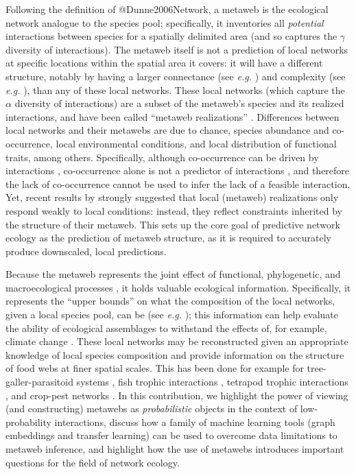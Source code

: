 Following the definition of @Dunne2006Network, a metaweb is the
ecological network analogue to the species pool; specifically, it
inventories all \emph{potential} interactions between species for a
spatially delimited area (and so captures the \(\gamma\) diversity of
interactions). The metaweb itself is not a prediction of local networks
at specific locations within the spatial area it covers: it will have a
different structure, notably by having a larger connectance (see
\emph{e.g.} \cite{Wood2015Effects}) and complexity (see \emph{e.g.}
\cite{Galiana2022Ecological}), than any of these local networks. These local
networks (which capture the \(\alpha\) diversity of interactions) are a
subset of the metaweb's species and its realized interactions, and have
been called ``metaweb realizations'' \cite{Poisot2015Species}.
Differences between local networks and their metawebs are due to chance,
species abundance and co-occurrence, local environmental conditions, and
local distribution of functional traits, among others. Specifically,
although co-occurrence can be driven by interactions
\cite{Cazelles2016Theory}, co-occurrence alone is not a predictor of
interactions \cite{Blanchet2020Cooccurrence, Thurman2019Testing}, and
therefore the lack of co-occurrence cannot be used to infer the lack of
a feasible interaction. Yet, recent results by \cite{Saravia2021Ecological}
strongly suggested that local (metaweb) realizations only respond weakly
to local conditions: instead, they reflect constraints inherited by the
structure of their metaweb. This sets up the core goal of predictive
network ecology as the prediction of metaweb structure, as it is
required to accurately produce downscaled, local predictions.

Because the metaweb represents the joint effect of functional,
phylogenetic, and macroecological processes
\cite{Morales-Castilla2015Inferring}, it holds valuable ecological
information. Specifically, it represents the ``upper bounds'' on what
the composition of the local networks, given a local species pool, can
be (see \emph{e.g.} \cite{McLeod2021Sampling}); this information can help
evaluate the ability of ecological assemblages to withstand the effects
of, for example, climate change \cite{Fricke2022Effects}. These local
networks may be reconstructed given an appropriate knowledge of local
species composition and provide information on the structure of food
webs at finer spatial scales. This has been done for example for
tree-galler-parasitoid systems \cite{Gravel2018Bringing}, fish trophic
interactions \cite{Albouy2019Marine}, tetrapod trophic interactions
\cite{Braga2019Spatial, OConnor2020Unveiling}, and crop-pest networks
\cite{Grunig2020Crop}. In this contribution, we highlight the power of
viewing (and constructing) metawebs as \emph{probabilistic} objects in
the context of low-probability interactions, discuss how a family of
machine learning tools (graph embeddings and transfer learning) can be
used to overcome data limitations to metaweb inference, and highlight
how the use of metawebs introduces important questions for the field of
network ecology.

